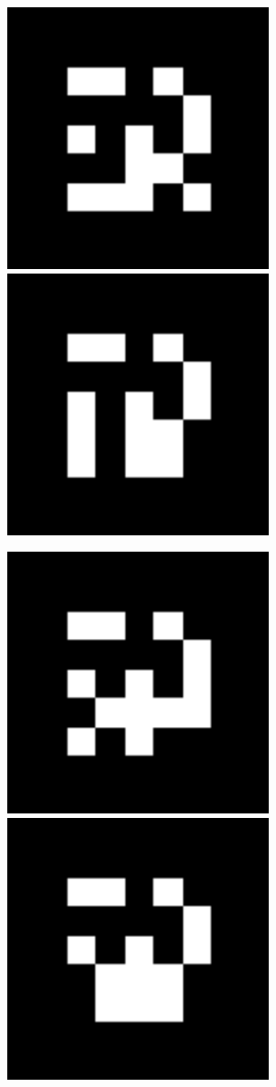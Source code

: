 \documentclass[10pt,letterpaper]{article}
\begin{document}
\includegraphics[width=3in]{MarkerData_113.png}
\includegraphics[width=3in]{MarkerData_114.png}


\includegraphics[width=3in]{MarkerData_115.png}
\includegraphics[width=3in]{MarkerData_116.png}
\end{document}
